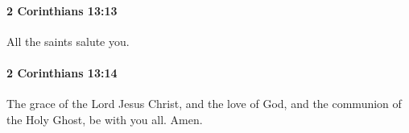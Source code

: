 		\paragraph{2 Corinthians 13:13} %
			\label{2CORINTHIANS-13-13}

			All the saints salute you.

			\begin{framed}
			\scriptsize
				\begin{compactdesc}
					\item[SBLG] 
				\end{compactdesc}
			\end{framed}

		\paragraph{2 Corinthians 13:14} %
			\label{2CORINTHIANS-13-14}

			The grace of the Lord Jesus Christ, and the love of God, and the communion of the Holy Ghost, be with you all.  Amen.

			\begin{framed}
			\scriptsize
				\begin{compactdesc}
					\item[SBLG] \gr{---}
				\end{compactdesc}
			\end{framed}
